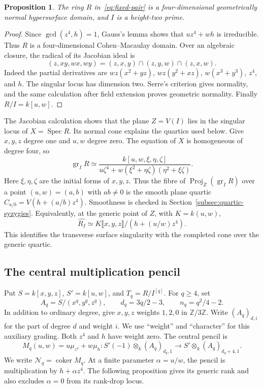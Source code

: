 \documentclass[11pt,a4paper,reqno]{amsart}
\numberwithin{equation}{section}
\theoremstyle{plain}
\newtheorem{proposition}[theorem]{Proposition}
\theoremstyle{definition}
\theoremstyle{remark}
\DeclareMathOperator{\coker}{coker}
\DeclareMathOperator{\gr}{gr}
\DeclareMathOperator{\Proj}{Proj}
\DeclareMathOperator{\Spec}{Spec}
\begin{document}
\begin{proposition}\label{prop:normal}
The ring $R$ in~\eqref{eq:fixed-pair} is a four-dimensional geometrically
normal hypersurface domain, and $I$ is a height-two prime.
\end{proposition}
\begin{proof}
Since $\gcd(z^4,h)=1$, Gauss's lemma shows that $uz^4+wh$ is irreducible.
Thus $R$ is a four-dimensional Cohen--Macaulay domain. Over an algebraic
closure, the radical of its Jacobian ideal is
\[
(z,xy,wx,wy)=(z,x,y)\cap(z,y,w)\cap(z,x,w).
\]
Indeed the partial derivatives are $wz(x^2+yz)$, $wz(y^2+xz)$,
$w(x^3+y^3)$, $z^4$, and $h$. The singular locus has dimension two.
Serre's criterion gives normality, and the same calculation after field
extension proves geometric normality. Finally $R/I=k[u,w]$.
\end{proof}

The Jacobian calculation shows that the plane $Z=V(I)$ lies in the
singular locus of $X=\Spec R$. Its normal cone explains the quartics
used below. Give $x,y,z$ degree one and $u,w$ degree zero. The equation
of $X$ is homogeneous of degree four, so
\begin{equation}\label{eq:normal-cone}
\gr_I R\simeq
\frac{k[u,w,\xi,\eta,\zeta]}
 {u\zeta^4+w(\xi^2+\eta\zeta)(\eta^2+\xi\zeta)}.
\end{equation}
Here $\xi,\eta,\zeta$ are the initial forms of $x,y,z$.
Thus the fibre of $\Proj_Z(\gr_I R)$ over a point
$(u,w)=(a,b)$ with $ab\ne0$ is the smooth plane quartic
$C_{a/b}=V(h+(a/b)z^4)$. Smoothness is checked in
Section~\ref{subsec:quartic-syzygies}.
Equivalently, at the generic point of $Z$, with $K=k(u,w)$,
\[
\widehat{R_I}\simeq K\llbracket x,y,z\rrbracket/(h+(u/w)z^4).
\]
This identifies the transverse surface singularity with the completed
cone over the generic quartic. 
\subsection{The central multiplication pencil}
Put $S=k[x,y,z]$, $S'=k[u,w]$, and $T_q=R/I^{[q]}$.
For $q\geq4$, set
\[
A_q=S/(x^q,y^q,z^q),\qquad d_q=3q/2-3,\qquad n_q=q^2/4-2.
\]
In addition to ordinary degree, give $x,y,z$ weights $1,2,0$ in
$\mathbb Z/3\mathbb Z$. Write $(A_q)_{d,i}$ for the part of degree $d$
and weight $i$. We use ``weight'' and ``character'' for this auxiliary
grading. Both $z^4$ and $h$ have weight zero.
The central pencil is
\begin{equation}\label{eq:central-pencil}
M_q(u,w)=u\mu_{z^4}+w\mu_h:
S'(-1)\otimes_k(A_q)_{d_q,1}
\longrightarrow S'\otimes_k(A_q)_{d_q+4,1}.
\end{equation}
We write $\mathcal N_q=\coker M_q$.
At a finite parameter $\alpha=u/w$, the pencil is multiplication by
$h+\alpha z^4$. The following proposition gives its generic rank and
also excludes $\alpha=0$ from its rank-drop locus.
\end{document}
